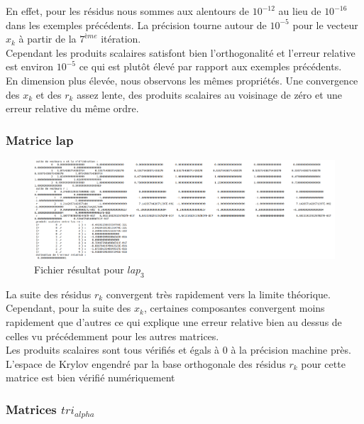 \documentclass[12,french]{report}
\begin{document}
En effet, pour les résidus nous sommes aux alentours de $10^{-12}$ au lieu de $10^{-16}$ dans les exemples précédents. La précision tourne autour de $10^{-5}$ pour le vecteur $x_{k}$ à partir de la $7^{ème}$ itération.\\

Cependant les produits scalaires satisfont bien l'orthogonalité et l'erreur relative est environ $10^{-5}$ ce qui est plutôt élevé par rapport aux exemples précédents.\\

En dimension plus élevée, nous observons les mêmes propriétés. Une convergence des $x_k$ et des $r_k$ assez lente, des produits scalaires au voisinage de zéro et une erreur relative du même ordre.

\subsubsection{Matrice lap}

\begin{figure}[H]
	\centering
	\includegraphics[width=1\textwidth]{./Images/Fichier_res_lap_3}
	\caption{Fichier résultat pour $lap_3$}
\end{figure}\vspace{0.2cm}

La suite des résidus $r_k$ convergent très rapidement vers la limite théorique. Cependant, pour la suite des $x_k$, certaines composantes convergent moins rapidement que d'autres ce qui explique une erreur relative bien au dessus de celles vu précédemment pour les autres matrices.\\

Les produits scalaires sont tous vérifiés et égals à 0 à la précision machine près. L'espace de Krylov engendré par la base orthogonale des résidus $r_k$ pour cette matrice est bien vérifié numériquement

\subsubsection{Matrices $tri_{alpha}$}
\end{document}
